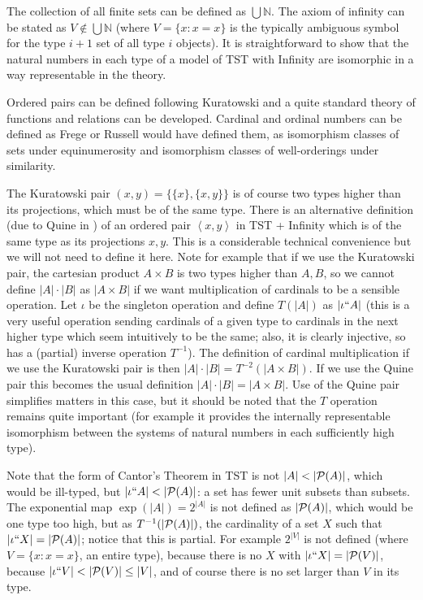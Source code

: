 \documentclass[112pt]{article}
\theoremstyle{definition}
\theoremstyle{remark}
\begin{document}
The collection of all finite sets can be defined as $\bigcup \mathbb N$.  The axiom of infinity can be stated as $V \not\in \bigcup \mathbb N$ (where $V= \{x:x=x\}$ is the typically ambiguous symbol for the type $i+1$ set of all type $i$ objects).  It is straightforward to show that the natural numbers in each type of a model of TST with Infinity are isomorphic in a way representable in the theory.

Ordered pairs can be defined following Kuratowski and a quite standard theory of functions and relations can be developed.  Cardinal and ordinal numbers can be defined as Frege or Russell would have defined them, as isomorphism classes of sets under equinumerosity and isomorphism classes of well-orderings under similarity.

The Kuratowski pair $(x,y) = \{\{x\},\{x,y\}\}$ is of course two types higher than its projections, which must be of the same type.  There is an alternative definition (due to Quine in \cite{quinepair}) of an ordered pair
$\left< x,y\right>$ in TST + Infinity which is of the same type as its projections $x,y$.  This is a considerable technical convenience but we will not need to define it here.  Note for example that if we use the Kuratowski pair, the cartesian product $A \times B$ is two types higher than $A,B$, so we cannot define $|A| \cdot |B|$ as $|A \times B|$ if we want multiplication of cardinals to be a sensible operation.  Let $\iota$ be the singleton operation and define $T(|A|)$ as $|\iota``A|$ (this is a very useful operation sending cardinals of a given type to cardinals in the next higher type which seem intuitively to be the same; also, it is clearly injective, so has a (partial) inverse operation $T^{-1}$).  The definition of cardinal multiplication if we use the Kuratowski pair is then $|A| \cdot |B| =T^{-2}(|A\times B|)$.  If we use the Quine pair this becomes the usual definition $|A| \cdot |B| =|A\times B|$.  Use of the Quine pair simplifies matters in this case, but it should be noted that the $T$ operation remains quite important (for example it provides the internally representable isomorphism between the systems of natural numbers in each sufficiently high type).

Note that the form of Cantor's Theorem in TST is not $|A| < |{\cal P}(A)|$, which would be ill-typed, but $|\iota``A|<|{\cal P}(A)|$:  a set has fewer unit subsets than subsets.  The exponential map $\exp(|A|) = 2^{|A|}$ is not defined as $|{\cal P}(A)|$, which would be one type too high, but as $T^{-1}(|{\cal P}(A)|)$, the cardinality of a set $X$ such that $|\iota``X| = |{\cal P}(A)|$;   notice that this is partial.  For example
$2^{|V|}$ is not defined (where $V=\{x:x=x\}$, an entire type), because there is no $X$ with $|\iota``X|=|{\cal P}(V)|$, because $|\iota``V|<|{\cal P}(V)| \leq |V|$, and of course there is no set larger than $V$ in its type.
\end{document}
